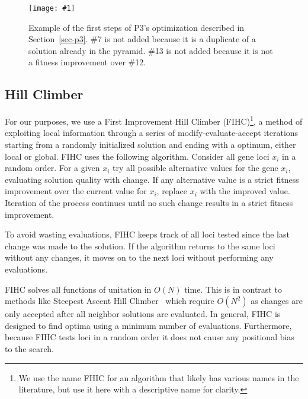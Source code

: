 \documentclass{sig-alternate}
\newcommand{\includegraphicsfit}[1]
{\texttt{[image: \#1]}}
\begin{document}
\begin{figure}
  \centering
  \includegraphicsfit{P3_big_fail}
  \caption{Example of the first steps of P3's optimization described in Section~\ref{sec-p3}.
  \#7 is not added because it is a duplicate of a solution already in the pyramid.  \#13 is
  not added because it is not a fitness improvement over \#12.}
  \label{fig-p3}
\end{figure}

\subsection{Hill Climber}
\label{sec-hillclimber}

For our purposes, we use a First Improvement Hill Climber
(FIHC)\footnote{We use the name FHIC for an algorithm that likely has
  various names in the literature, but use it here with a descriptive
  name for clarity.}, a method of exploiting local information through
a series of modify-evaluate-accept iterations starting from a randomly
initialized solution and ending with a optimum, either local or global.
FIHC uses the following algorithm.  Consider all gene loci
$x_i$ in a random order.  For a given $x_i$ try all possible
alternative values for the gene $x_i$, evaluating solution quality
with change.  If any alternative value is a strict fitness improvement
over the current value for $x_i$, replace $x_i$ with the improved
value.  Iteration of the process continues until no such change results in
a strict fitness improvement.

To avoid wasting evaluations, FIHC keeps track of all loci tested since the last
change was made to the solution.  If the algorithm returns to the same loci without
any changes, it moves on to the next loci without performing any evaluations.

FIHC solves all functions of unitation in $O(N)$ time.  This is in contrast to
methods like Steepest Ascent Hill Climber~\cite{bosman:2011:lsbbo, goldman:2012:ltga}
which require $O(N^2)$ as changes are only accepted after all neighbor solutions
are evaluated.  In general, FIHC is designed to find optima using a minimum number
of evaluations.  Furthermore, because FIHC tests loci in a random order it does
not cause any positional bias to the search.
\end{document}
